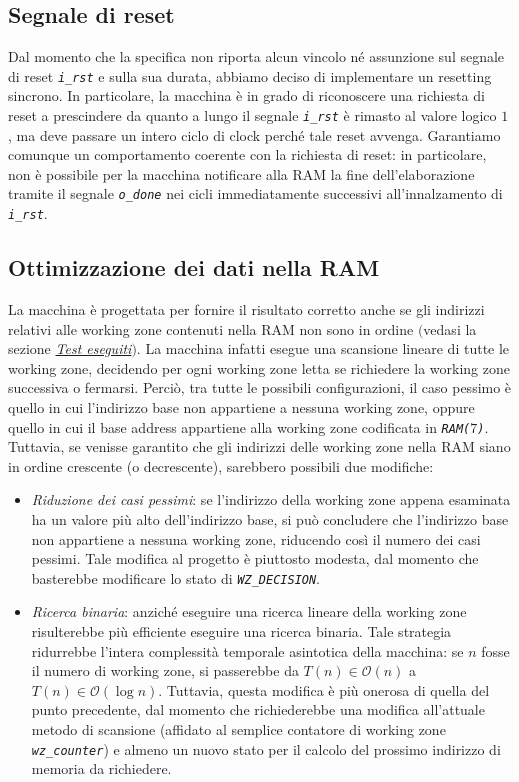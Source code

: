 \documentclass[12pt,a4paper,titlepage]{article}
\begin{document}
		\subsection{Segnale di reset} \label{sec:reset}
			Dal momento che la specifica non riporta alcun vincolo né assunzione sul segnale di reset \textit{\texttt{i\_rst}} e sulla sua durata, abbiamo deciso di implementare un resetting sincrono. In particolare, la macchina è in grado di riconoscere una richiesta di reset a prescindere da quanto a lungo il segnale \textit{\texttt{i\_rst}} è rimasto al valore logico $1$, ma deve passare un intero ciclo di clock perché tale reset avvenga. Garantiamo comunque un comportamento coerente con la richiesta di reset: in particolare, non è possibile per la macchina notificare alla RAM la fine dell'elaborazione tramite il segnale \textit{\texttt{o\_done}} nei cicli immediatamente successivi all'innalzamento di \textit{\texttt{i\_rst}}.
		\subsection{Ottimizzazione dei dati nella RAM} \label{sec:ottimizzazione}
			La macchina è progettata per fornire il risultato corretto anche se gli indirizzi relativi alle working zone contenuti nella RAM non sono in ordine $($vedasi la sezione \hyperref[sec:test]{\textit{Test eseguiti}}$)$. %
			La macchina infatti esegue una scansione lineare di tutte le working zone, decidendo per ogni working zone letta se richiedere la working zone successiva o fermarsi. Perciò, tra tutte le possibili configurazioni, il caso pessimo è quello in cui l'indirizzo base non appartiene a nessuna working zone, oppure quello in cui il base address appartiene alla working zone codificata in \textit{\texttt{RAM($7$)}}.
			Tuttavia, se venisse garantito che gli indirizzi delle working zone nella RAM siano in ordine crescente (o decrescente), sarebbero possibili due modifiche:
			\begin{itemize}
			
			\item \textit{Riduzione dei casi pessimi}: se l'indirizzo della working zone appena esaminata ha un valore più alto dell'indirizzo base, si può concludere che l'indirizzo base non appartiene a nessuna working zone, riducendo così il numero dei casi pessimi. Tale modifica al progetto è piuttosto modesta, dal momento che basterebbe modificare lo stato di \textit{\texttt{WZ\_DECISION}}.
			
			\item \textit{Ricerca binaria}: anziché eseguire una ricerca lineare della working zone risulterebbe più efficiente eseguire una ricerca binaria. Tale strategia ridurrebbe l'intera complessità temporale asintotica della macchina: se $n$ fosse il numero di working zone, si passerebbe da $T(n) \in \mathcal{O}(n)$ a $T(n) \in \mathcal{O}(\log n)$. Tuttavia, questa modifica è più onerosa di quella del punto precedente, dal momento che richiederebbe una modifica all'attuale metodo di scansione (affidato al semplice contatore di working zone \textit{\texttt{wz\_counter}}) e almeno un nuovo stato per il calcolo del prossimo indirizzo di memoria da richiedere.
			\end{itemize}
\end{document}
